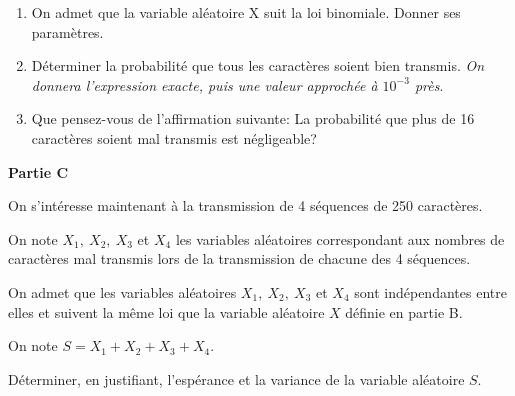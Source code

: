 \documentclass[10pt]{article}
\begin{document}
\medskip

\begin{enumerate}
\item On admet que la variable aléatoire X suit la loi binomiale. Donner ses paramètres.
\item Déterminer la probabilité que tous les caractères soient bien transmis. \emph{On donnera
l'expression exacte, puis une valeur approchée à $10^{-3}$ près}.
\item Que pensez-vous de l'affirmation suivante: \og La probabilité que plus de 16
caractères soient mal transmis est négligeable\fg ?
\end{enumerate}

\medskip

\textbf{Partie C}

\medskip

On s'intéresse maintenant à la transmission de 4 séquences de 250 caractères.

On note $X_1,\: X_2,\: X_3$\: et $X_4$ les variables aléatoires correspondant aux nombres de caractères mal transmis lors de la transmission de chacune des 4 séquences. 

On admet que les variables aléatoires $X_1,\: X_2,\: X_3$\: et $X_4$ sont indépendantes entre elles et suivent la même loi que la variable aléatoire $X$ définie en partie B.

On note $S = X_1 + X_2 + X_3 + X_4.$

Déterminer, en justifiant, l'espérance et la variance de la variable aléatoire $S$.
\end{document}
